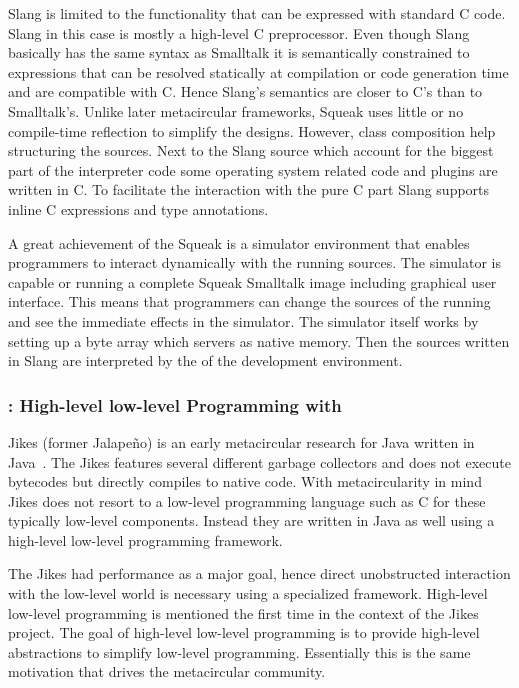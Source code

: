 Slang is limited to the functionality that can be expressed with standard C code.
Slang in this case is mostly a high-level C preprocessor.
Even though Slang basically has the same syntax as Smalltalk it is semantically constrained to expressions that can be resolved statically at compilation or code generation time and are compatible with C.
Hence Slang's semantics are closer to C's than to Smalltalk's.
Unlike later metacircular frameworks, Squeak uses little or no compile-time reflection to simplify the \VM designs.
However, class composition help structuring the sources.
Next to the Slang source which account for the biggest part of the interpreter code some operating system related code and plugins are written in C.
To facilitate the interaction with the pure C part Slang supports inline C expressions and type annotations.

A great achievement of the Squeak \VM is a simulator environment that enables programmers to interact dynamically with the running \VM sources.
The simulator is capable or running a complete Squeak Smalltalk image including graphical user interface.
This means that programmers can change the sources of the running \VM and see the immediate effects in the simulator.
The simulator itself works by setting up a byte array which servers as native memory.
Then the \VM sources written in Slang are interpreted by the \VM of the development environment.

\subsubsection*{\Jikes: High-level low-level Programming with \MMTK}
Jikes (former Jalapeño) is an early metacircular research \VM for Java written in Java~\cite{Alpe00a}.
The Jikes \VM features several different garbage collectors and does not execute bytecodes but directly compiles to native code.
With metacircularity in mind Jikes does not resort to a low-level programming language such as C for these typically low-level \VM components.
Instead they are written in Java as well using a high-level low-level programming framework.

The Jikes \VM had performance as a major goal, hence direct unobstructed interaction with the low-level world is necessary using a specialized framework.
High-level low-level programming \cite{Fram09a} is mentioned the first time in the context of the Jikes \VM project.
The goal of high-level low-level programming is to provide high-level abstractions to simplify low-level programming.
Essentially this is the same motivation that drives the metacircular \VM community.


